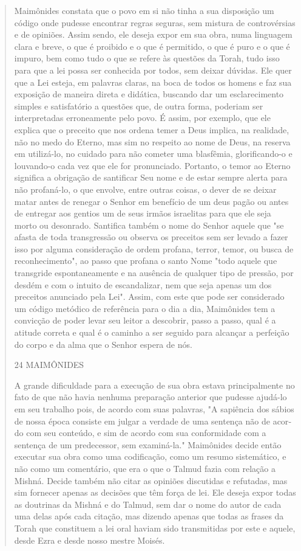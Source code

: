 \begin{quote}
Maimônides constata que o povo em si não tinha a sua disposição um
código onde pudesse encontrar regras seguras, sem mistura de
controvér­sias e de opiniões. Assim sendo, ele deseja expor em sua obra,
numa linguagem clara e breve, o que é proibido e o que é permitido, o
que é puro e o que é impuro, bem como tudo o que se refere às questões
da Torah, tudo isso para que a lei possa ser conhecida por todos, sem
deixar dúvidas. Ele quer que a Lei esteja, em palavras claras, na boca
de todos os homens e faz sua exposição de maneira direta e didática,
buscando dar um esclarecimento simples e satisfa­tório a questões que,
de outra forma, poderiam ser interpretadas erroneamente pelo povo. É
assim, por exemplo, que ele explica que o preceito que nos orde­na temer
a Deus implica, na realidade, não no medo do Eterno, mas sim no respeito
ao nome de Deus, na reserva em utilizá-lo, no cuidado para não come­ter
uma blasfêmia, glorificando-o e louvando-o cada vez que ele for
pronuncia­do. Portanto, o temor ao Eterno significa a obrigação de
santificar Seu nome e de estar sempre alerta para não profaná-lo, o que
envolve, entre outras coi­sas, o dever de se deixar matar antes de
renegar o Senhor em benefício de um deus pagão ou antes de entregar aos
gentios um de seus irmãos israelitas para que ele seja morto ou
desonrado. Santifica também o nome do Senhor aquele que "se afasta de
toda transgressão ou observa os preceitos sem ser levado a fazer isso
por alguma consideração de ordem profana, terror, temor, ou busca de
reconhecimento", ao passo que profana o santo Nome "todo aquele que
transgride espontaneamente e na ausência de qualquer tipo de pressão,
por des­dém e com o intuito de escandalizar, nem que seja apenas um dos
preceitos anunciado pela Lei". Assim, com este que pode ser considerado
um código me­tódico de referência para o dia a dia, Maimônides tem a
convicção de poder levar seu leitor a descobrir, passo a passo, qual é a
atitude correta e qual é o caminho a ser seguido para alcançar a
perfeição do corpo e da alma que o Se­nhor espera de nós.

24 MAIMÔNIDES

A grande dificuldade para a execução de sua obra estava principal­mente
no fato de que não havia nenhuma preparação anterior que pudesse
aju­dá-lo em seu trabalho pois, de acordo com suas palavras, "A
sapiência dos sá­bios de nossa época consiste em julgar a verdade de uma
sentença não de acor­do com seu conteúdo, e sim de acordo com sua
conformidade com a sentença de um predecessor, sem examiná-la."
Maimônides decide então executar sua obra como uma codificação, como um
resumo sistemático, e não como um co­mentário, que era o que o Talmud
fazia com relação a Mishná. Decide também não citar as opiniões
discutidas e refutadas, mas sim fornecer apenas as deci­sões que têm
força de lei. Ele deseja expor todas as doutrinas da Mishná e do Talmud,
sem dar o nome do autor de cada uma delas após cada citação, mas dizendo
apenas que todas as frases da Torah que constituem a lei oral haviam
sido transmitidas por este e aquele, desde Ezra e desde nosso mestre
Moisés.


\end{quote}
